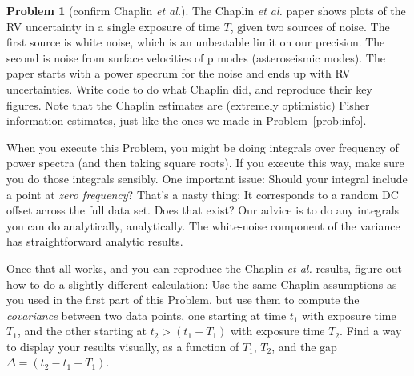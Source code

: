\documentclass{article}
\theoremstyle{definition}
\newcommand{\problemname}{Problem}
\newtheorem{problem}{\problemname}
\newcommand{\probref}[1]{\problemname~\ref{#1}}
\theoremstyle{remark}
\begin{document}
\begin{problem}[confirm Chaplin \textsl{et al.}]\label{prob:chaplin}
The Chaplin \textsl{et al.} paper \cite{chaplin} shows plots of the RV uncertainty in a single exposure of time $T$,
given two sources of noise.
The first source is white noise, which is an unbeatable limit on our precision.
The second is noise from surface velocities of p modes (asteroseismic modes).
The paper \cite{chaplin} starts with a power specrum for the noise and ends up with RV uncertainties.
Write code to do what Chaplin did, and reproduce their key figures.
Note that the Chaplin estimates are (extremely optimistic) Fisher information estimates, just like the ones we made in \probref{prob:info}.

When you execute this \problemname{}, you might be doing integrals over frequency of power spectra (and then taking square roots).
If you execute this way, make sure you do those integrals sensibly.
One important issue: Should your integral include a point at \emph{zero frequency}?
That's a nasty thing: It corresponds to a random DC offset across the full data set.
Does that exist?
Our advice is to do any integrals you can do analytically, analytically.
The white-noise component of the variance has straightforward analytic results.

Once that all works, and you can reproduce the Chaplin \textsl{et al.} results, figure out how to do a slightly different calculation:
Use the same Chaplin assumptions as you used in the first part of this \problemname{}, but use them to compute the \emph{covariance} between two data points, one starting at time $t_1$ with exposure time $T_1$, and the other starting at $t_2>(t_1 + T_1)$ with exposure time $T_2$.
Find a way to display your results visually, as a function of $T_1$, $T_2$, and the gap $\Delta=(t_2 - t_1 - T_1)$.
\end{problem}
\end{document}
